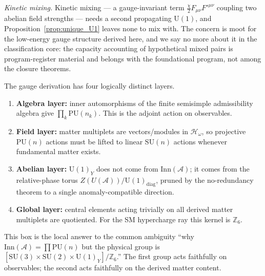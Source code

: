 \documentclass[11pt]{article}
\theoremstyle{definition}
\newcommand{\SU}{\mathrm{SU}}
\newcommand{\U}{\mathrm{U}}
\begin{document}
\smallskip\noindent\textit{Kinetic mixing.}\quad
Kinetic mixing --- a gauge-invariant term
$\frac{\chi}{2} F_{\mu\nu} F'^{\mu\nu}$ coupling two abelian field
strengths --- needs a second propagating $\U(1)$, and
Proposition~\ref{prop:unique_U1} leaves none to mix with.  The
concern is moot for the low-energy gauge structure derived here, and
we say no more about it in the classification core: the capacity
accounting of hypothetical mixed pairs is program-register material
and belongs with the foundational program, not among the closure
theorems.

\begin{tcolorbox}[apfbox, title={Roadmap: from $\mathrm{PU}$ automorphisms to the physical SM group}]
\footnotesize
The gauge derivation has four logically distinct layers.
\begin{enumerate}[nosep,leftmargin=1.8em]
  \item \textbf{Algebra layer:} inner automorphisms of the finite
  semisimple admissibility algebra give $\prod_k\mathrm{PU}(n_k)$.
  This is the adjoint action on observables.
  \item \textbf{Field layer:} matter multiplets are vectors/modules in
  $\mathcal H_\omega$, so projective $\mathrm{PU}(n)$ actions must be
  lifted to linear $\SU(n)$ actions whenever fundamental matter exists.
  \item \textbf{Abelian layer:} $\U(1)_Y$ does not come from
  $\mathrm{Inn}(\mathcal A)$; it comes from the relative-phase torus
  $Z(U(\mathcal A))/\U(1)_{\mathrm{diag}}$, pruned by the no-redundancy
  theorem to a single anomaly-compatible direction.
  \item \textbf{Global layer:} central elements acting trivially on all
  derived matter multiplets are quotiented.  For the SM hypercharge ray
  this kernel is $\mathbb Z_6$.
\end{enumerate}
This box is the local answer to the common ambiguity ``why
$\mathrm{Inn}(\mathcal A)=\prod\mathrm{PU}(n)$ but the physical group is
$[\SU(3)\times\SU(2)\times\U(1)_Y]/\mathbb Z_6$.''  The first group acts
faithfully on observables; the second acts faithfully on the derived
matter content.
\end{tcolorbox}
\end{document}
